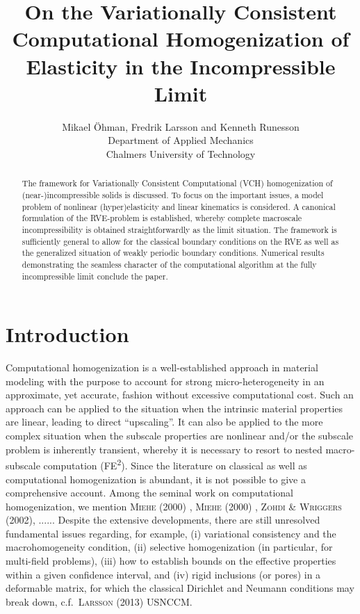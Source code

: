 \documentclass[12pt,a4paper]{article}
\title{On the Variationally Consistent Computational Homogenization of Elasticity in the Incompressible Limit}
\author{
Mikael Öhman, Fredrik Larsson and Kenneth Runesson\\
Department of Applied Mechanics \\
Chalmers University of Technology}
\begin{document}
\maketitle
\begin{abstract}
The framework for Variationally Consistent Computational (VCH) homogenization of (near-)incompressible solids is discussed.
To focus on the important issues, a model problem of nonlinear (hyper)elasticity and linear kinematics is considered.
A canonical formulation of the RVE-problem is established, whereby complete macroscale incompressibility is obtained straightforwardly as the limit situation.
The framework is sufficiently general to allow for the classical boundary conditions on the RVE as well as the generalized situation of weakly periodic boundary conditions.
Numerical results demonstrating the seamless character of the computational algorithm at the fully incompressible limit conclude the paper.
\end{abstract}

\section{Introduction}

Computational homogenization is a well-established approach in material modeling with the purpose to account for strong micro-heterogeneity in an approximate, yet accurate, fashion without excessive computational cost.
Such an approach can be applied to the situation when the intrinsic material properties are linear, leading to direct ``upscaling''.
It can also be applied to the more complex situation when the subscale properties are nonlinear and/or the subscale problem is inherently transient, whereby it is necessary to resort to nested macro-subscale computation (FE\textsuperscript{2}).
Since the literature on classical as well as computational homogenization is abundant, it is not possible to give a comprehensive account.
Among the seminal work on computational homogenization, we mention \textsc{Miehe (2000)} \cite{Miehe2000}, \textsc{Miehe (2000)} \cite{Miehe2000}, \textsc{Zohdi \& Wriggers (2002)}, ......
Despite the extensive developments, there are still unresolved fundamental issues regarding, for example, (i) variational consistency and the macrohomogeneity condition, (ii) selective homogenization (in particular, for multi-field problems), (iii) how to establish bounds on the effective properties within a given confidence interval, and (iv) rigid inclusions (or pores) in a deformable matrix, for which the classical Dirichlet and Neumann conditions may break down, c.f.\  \textsc{Larsson (2013)} \cite{Lar2013} USNCCM.
\end{document}
